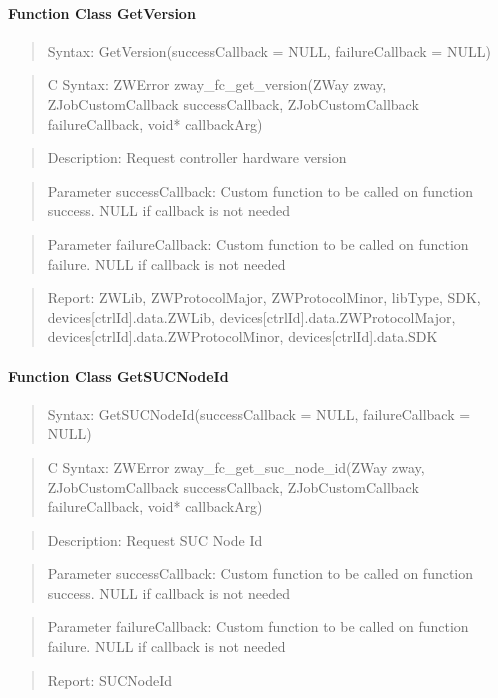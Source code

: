 \paragraph{Function Class GetVersion}
\begin{quote}Syntax: GetVersion(successCallback = NULL, failureCallback = NULL)\end{quote}
\begin{quote}C Syntax: ZWError zway\_fc\_get\_version(ZWay zway, ZJobCustomCallback successCallback, ZJobCustomCallback failureCallback, void* callbackArg)\end{quote}
\begin{quote}Description: Request controller hardware version\end{quote}
\begin{quote}Parameter successCallback: Custom function to be called on function success. NULL if callback is not needed\end{quote}
\begin{quote}Parameter failureCallback: Custom function to be called on function failure. NULL if callback is not needed\end{quote}
\begin{quote}Report: ZWLib, ZWProtocolMajor, ZWProtocolMinor, libType, SDK, devices[ctrlId].data.ZWLib, devices[ctrlId].data.ZWProtocolMajor, devices[ctrlId].data.ZWProtocolMinor, devices[ctrlId].data.SDK\end{quote}

\paragraph{Function Class GetSUCNodeId}
\begin{quote}Syntax: GetSUCNodeId(successCallback = NULL, failureCallback = NULL)\end{quote}
\begin{quote}C Syntax: ZWError zway\_fc\_get\_suc\_node\_id(ZWay zway, ZJobCustomCallback successCallback, ZJobCustomCallback failureCallback, void* callbackArg)\end{quote}
\begin{quote}Description: Request SUC Node Id\end{quote}
\begin{quote}Parameter successCallback: Custom function to be called on function success. NULL if callback is not needed\end{quote}
\begin{quote}Parameter failureCallback: Custom function to be called on function failure. NULL if callback is not needed\end{quote}
\begin{quote}Report: SUCNodeId\end{quote}

